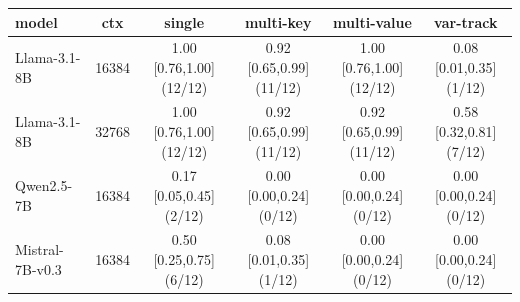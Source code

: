 \begin{tabular}{lccccc}
\toprule
model & ctx & single & multi-key & multi-value & var-track \\
\midrule
Llama-3.1-8B & 16384 & 1.00 [0.76,1.00] (12/12) & 0.92 [0.65,0.99] (11/12) & 1.00 [0.76,1.00] (12/12) & 0.08 [0.01,0.35] (1/12) \\
Llama-3.1-8B & 32768 & 1.00 [0.76,1.00] (12/12) & 0.92 [0.65,0.99] (11/12) & 0.92 [0.65,0.99] (11/12) & 0.58 [0.32,0.81] (7/12) \\
Qwen2.5-7B & 16384 & 0.17 [0.05,0.45] (2/12) & 0.00 [0.00,0.24] (0/12) & 0.00 [0.00,0.24] (0/12) & 0.00 [0.00,0.24] (0/12) \\
Mistral-7B-v0.3 & 16384 & 0.50 [0.25,0.75] (6/12) & 0.08 [0.01,0.35] (1/12) & 0.00 [0.00,0.24] (0/12) & 0.00 [0.00,0.24] (0/12) \\
\bottomrule
\end{tabular}
